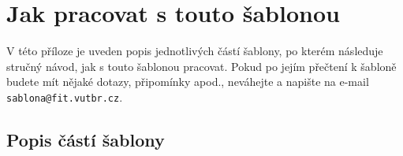 





\chapter{Jak pracovat s touto šablonou}
\label{jak}

V této příloze je uveden popis jednotlivých částí šablony, po kterém následuje stručný návod, jak s touto šablonou pracovat. Pokud po jejím přečtení k šabloně budete mít nějaké dotazy, připomínky apod., neváhejte a napište na e-mail \texttt{sablona@fit.vutbr.cz}.

\section*{Popis částí šablony}

